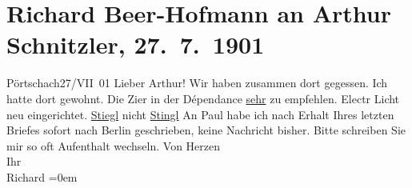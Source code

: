 

               \section[Richard Beer-Hofmann an Arthur Schnitzler, 27. 7. 1901]{ Richard Beer-Hofmann an Arthur Schnitzler, 27. 7. 1901}\nopagebreak{}\rehead{ }\begin{ledgroupsized}[t]{13cm}\normalsize\beginnumbering{} \toendnotes[C]{\smallbreak\pagebreak[2]} 
\toendnotes[C]{\smallbreak}\pstart
           \raggedleft{}{\pb}Pörtschach27/VII 01\pend
           \pstart
           Lieber Arthur! Wir haben zusammen dort gegessen. Ich hatte dort gewohnt. Die Zi{\geminationm}er in der Dépendance \uline{sehr} zu empfehlen. Electr Licht neu eingerichtet.\pend
           \pstart
           \uline{Stiegl} nicht \uline{Stingl}\pend
           \pstart
           An Paul habe ich nach Erhalt Ihres letzten
               Briefes sofort nach Berlin geschrieben, {\pb}keine Nachricht bisher.\pend
           \pstart
           Bitte schreiben Sie mir so oft \label{T_L01153_1v}\label{T_L01153_1h} Aufenthalt wechseln.\pend
           \pstart
           Von Herzen{\\[\baselineskip]}Ihr{\\[\baselineskip]}\spacefill\mbox{Richard}\pend
           \leftskip=0em{}          \endnumbering{}\end{ledgroupsized}  \newcommand{\dateiname}{L01153}\newcommand{\titel}{Richard Beer-Hofmann an Arthur Schnitzler, 27. 7. 1901}\newcommand{\editorInnen}{Martin Anton Müller und Gerd-Hermann Susen}
            \footnotesize
\begin{ledgroupsized}[t]{11.5cm}
\end{ledgroupsized}
         
      
